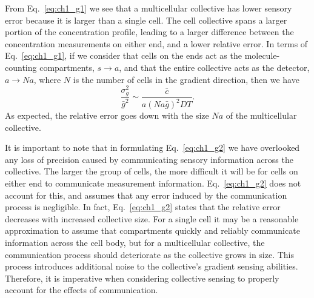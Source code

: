 From Eq.\ \ref{eq:ch1_g1} we see that a multicellular collective has lower sensory error because it is larger than a single cell. The cell collective spans a larger portion of the concentration profile, leading to a larger difference between the concentration measurements on either end, and a lower relative error. In terms of Eq.\ \ref{eq:ch1_g1}, if we consider that cells on the ends act as the molecule-counting compartments, $s \to a$, and that the entire collective acts as the detector, $a \to Na$, where $N$ is the number of cells in the gradient direction, then we have \cite{mugler2016limits}
\begin{equation} \label{eq:ch1_g2}
    \frac{\sigma_g^2}{\bar{g}^2} \sim \frac{\bar{c}}{a(Na\bar{g})^2DT}.
\end{equation}
As expected, the relative error goes down with the size $Na$ of the multicellular collective.

It is important to note that in formulating Eq.\ \ref{eq:ch1_g2} we have overlooked any loss of precision caused by communicating sensory information across the collective. The larger the group of cells, the more difficult it will be for cells on either end to communicate measurement information. Eq.\ \ref{eq:ch1_g2} does not account for this, and assumes that any error induced by the communication process is negligible. In fact, Eq.\ \ref{eq:ch1_g2} states that the relative error decreases with increased collective size. For a single cell it may be a reasonable approximation to assume that compartments quickly and reliably communicate information across the cell body, but for a multicellular collective, the communication process should deteriorate as the collective grows in size. This process introduces additional noise to the collective's gradient sensing abilities. Therefore, it is imperative when considering collective sensing to properly account for the effects of communication.

